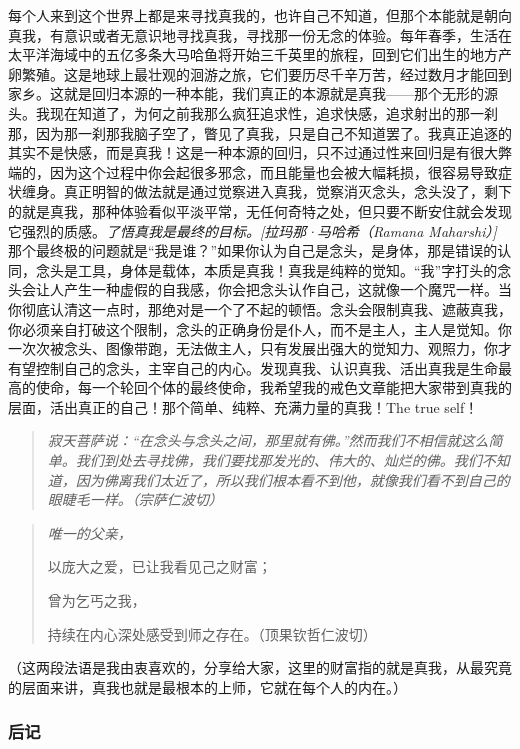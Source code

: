 每个人来到这个世界上都是来寻找真我的，也许自己不知道，但那个本能就是朝向真我，有意识或者无意识地寻找真我，寻找那一份无念的体验。每年春季，生活在太平洋海域中的五亿多条大马哈鱼将开始三千英里的旅程，回到它们出生的地方产卵繁殖。这是地球上最壮观的洄游之旅，它们要历尽千辛万苦，经过数月才能回到家乡。这就是回归本源的一种本能，我们真正的本源就是真我——那个无形的源头。我现在知道了，为何之前我那么疯狂追求性，追求快感，追求射出的那一刹那，因为那一刹那我脑子空了，瞥见了真我，只是自己不知道罢了。我真正追逐的其实不是快感，而是真我！这是一种本源的回归，只不过通过性来回归是有很大弊端的，因为这个过程中你会起很多邪念，而且能量也会被大幅耗损，很容易导致症状缠身。真正明智的做法就是通过觉察进入真我，觉察消灭念头，念头没了，剩下的就是真我，那种体验看似平淡平常，无任何奇特之处，但只要不断安住就会发现它强烈的质感。\textit{了悟真我是最终的目标。[拉玛那·马哈希（Ramana Maharshi）]} 那个最终极的问题就是“我是谁？”如果你认为自己是念头，是身体，那是错误的认同，念头是工具，身体是载体，本质是真我！真我是纯粹的觉知。“我”字打头的念头会让人产生一种虚假的自我感，你会把念头认作自己，这就像一个魔咒一样。当你彻底认清这一点时，那绝对是一个了不起的顿悟。念头会限制真我、遮蔽真我，你必须亲自打破这个限制，念头的正确身份是仆人，而不是主人，主人是觉知。你一次次被念头、图像带跑，无法做主人，只有发展出强大的觉知力、观照力，你才有望控制自己的念头，主宰自己的内心。发现真我、认识真我、活出真我是生命最高的使命，每一个轮回个体的最终使命，我希望我的戒色文章能把大家带到真我的层面，活出真正的自己！那个简单、纯粹、充满力量的真我！The true self！

\begin{quote}\it
    寂天菩萨说：“在念头与念头之间，那里就有佛。”然而我们不相信就这么简单。我们到处去寻找佛，我们要找那发光的、伟大的、灿烂的佛。我们不知道，因为佛离我们太近了，所以我们根本看不到他，就像我们看不到自己的眼睫毛一样。（宗萨仁波切）
\end{quote}

\begin{quotation}\it
    唯一的父亲，

    以庞大之爱，已让我看见己之财富；

    曾为乞丐之我，

    持续在内心深处感受到师之存在。（顶果钦哲仁波切）
\end{quotation}

（这两段法语是我由衷喜欢的，分享给大家，这里的财富指的就是真我，从最究竟的层面来讲，真我也就是最根本的上师，它就在每个人的内在。）

\subsubsection{后记}

